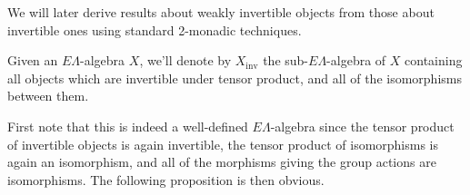 \documentclass{amsbook} %
\newenvironment{eq*}{\begin{equation*}}{\end{equation*}}
\numberwithin{section}{chapter}
\begin{document}
We will later derive results about weakly invertible objects from those about invertible ones using standard 2-monadic techniques.



\begin{Defi} Given an $E\Lambda$-algebra $X$, we'll denote by $X_{\mathrm{inv}}$ the sub-$E\Lambda$-algebra of $X$ containing all objects which are invertible under tensor product, and all of the isomorphisms between them. \end{Defi} 

First note that this is indeed a well-defined $E\Lambda$-algebra since the tensor product of invertible objects is again invertible, the tensor product of isomorphisms is again an isomorphism, and all of the morphisms giving the group actions are isomorphisms. The following proposition is then obvious.
\end{document}
